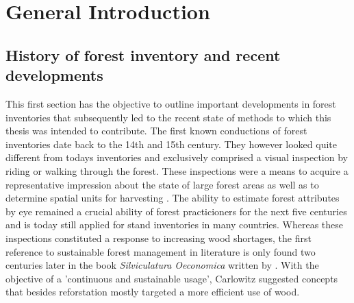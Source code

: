 	

			
	

	
\chapter{General Introduction}
\label{chap:intro}
\newpage
\section{History of forest inventory and recent developments}
\label{sec:intro:hist_soa}

This first section has the objective to outline important developments in forest inventories that subsequently led to the recent state of methods to which this thesis was intended to contribute. 
The first known conductions of forest inventories date back to the 14th and 15th century. They however looked quite different from todays inventories and exclusively comprised a visual inspection by riding or walking through the forest. These inspections were a means to acquire a representative impression about the state of large forest areas as well as to determine spatial units for harvesting \citep{zoehrer1980}. The ability to estimate forest attributes by eye remained a crucial ability of forest practicioners for the next five centuries and is today still applied for stand inventories in many countries. Whereas these inspections constituted a response to increasing wood shortages, the first reference to sustainable forest management in literature is only found two centuries later in the book \textit{Silviculatura Oeconomica} written by \citet{carlowitz1713}. With the objective of a 'continuous and sustainable usage', Carlowitz suggested concepts that besides reforstation mostly targeted a more efficient use of wood.\par

